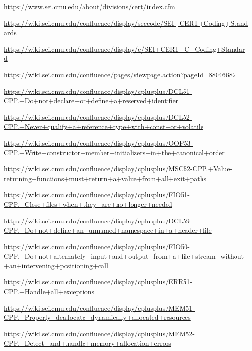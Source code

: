 
\begin{thebibliography}{0}
	
	\url{https://www.sei.cmu.edu/about/divisions/cert/index.cfm}
	
	\url{https://wiki.sei.cmu.edu/confluence/display/seccode/SEI+CERT+Coding+Standards}

	\url{https://wiki.sei.cmu.edu/confluence/display/c/SEI+CERT+C+Coding+Standard}

	\url{https://wiki.sei.cmu.edu/confluence/pages/viewpage.action?pageId=88046682}

	\url{https://wiki.sei.cmu.edu/confluence/display/cplusplus/DCL51-CPP.+Do+not+declare+or+define+a+reserved+identifier}

	\url{https://wiki.sei.cmu.edu/confluence/display/cplusplus/DCL52-CPP.+Never+qualify+a+reference+type+with+const+or+volatile}

	\url{https://wiki.sei.cmu.edu/confluence/display/cplusplus/OOP53-CPP.+Write+constructor+member+initializers+in+the+canonical+order}

	\url{https://wiki.sei.cmu.edu/confluence/display/cplusplus/MSC52-CPP.+Value-returning+functions+must+return+a+value+from+all+exit+paths}

	\url{https://wiki.sei.cmu.edu/confluence/display/cplusplus/FIO51-CPP.+Close+files+when+they+are+no+longer+needed}

	\url{https://wiki.sei.cmu.edu/confluence/display/cplusplus/DCL59-CPP.+Do+not+define+an+unnamed+namespace+in+a+header+file}
	
	\url{https://wiki.sei.cmu.edu/confluence/display/cplusplus/FIO50-CPP.+Do+not+alternately+input+and+output+from+a+file+stream+without+an+intervening+positioning+call}
	
	\url{https://wiki.sei.cmu.edu/confluence/display/cplusplus/ERR51-CPP.+Handle+all+exceptions}
	
	\url{https://wiki.sei.cmu.edu/confluence/display/cplusplus/MEM51-CPP.+Properly+deallocate+dynamically+allocated+resources}
	
	\url{https://wiki.sei.cmu.edu/confluence/display/cplusplus/MEM52-CPP.+Detect+and+handle+memory+allocation+errors}
\end{thebibliography}

